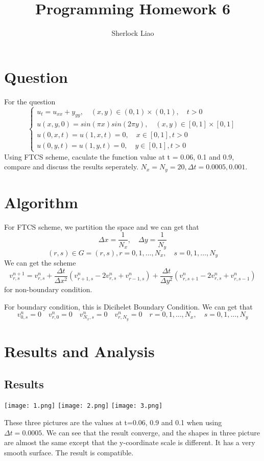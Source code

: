 \documentclass[UTF8]{article}
\author {Sherlock Liao}
\title {Programming Homework 6}
\begin{document}
\maketitle
\section{Question}
For the question
$$
\begin{cases}
u_t = u_{xx} + y_{yy}, \quad (x,y) \in (0,1) \times (0,1), \quad t > 0 \\
u(x,y,0) = sin(\pi x)sin(2\pi y), \quad (x,y) \in [0,1] \times [0,1] \\
u(0,x,t) = u(1,x,t) = 0, \quad x\in [0,1], t > 0 \\
u(0,y,t) = u(1,y,t) = 0, \quad y\in [0,1], t > 0
\end{cases}
$$
Using FTCS scheme, caculate the function value at t = 0.06, 0.1 and 0.9, compare and discuss the results seperately. $N_x = N_y = 20, \Delta t = 0.0005, 0.001.$

\section{Algorithm}
For FTCS scheme, we partition the space and we can get that
$$
\Delta x = \frac{1}{N_x}, \quad \Delta y = \frac{1}{N_y}
$$
$$
(r,s) \in G = {(r,s), r = 0, 1,\dots, N_x, \quad s = 0, 1, \dots, N_y}
$$
We can get the scheme
$$
v_{r,s}^{n+1} = v_{r,s}^n + \frac{\Delta t}{\Delta x^2}(v_{r+1,s}^n -2v_{r,s}^n + v_{r-1,s}^n) + \frac{\Delta t}{\Delta y^2}(v_{r,s+1}^n-2v_{r,s}^n+v_{r,s-1}^n)
$$
for non-boundary condition.

For boundary condition, this is Dicihelet Boundary Condition. We can get that
$$
v_{0,s}^n = 0 \quad v_{r,0}^n = 0 \quad v_{N_x,s}^n = 0 \quad v_{r, N_y}^n = 0 \quad r=0, 1, \dots, N_x, \quad s = 0, 1, \dots, N_y
$$

\section{Results and Analysis}
\subsection{Results}

\texttt{[image: 1.png]}
\texttt{[image: 2.png]}
\texttt{[image: 3.png]}

These three pictures are the values at t=0.06, 0.9 and 0.1 when using $\Delta t = 0.0005$. We can see that the result converge, and the shapes in three picture are almost the same except that the y-coordinate scale is different. It has a very smooth surface. The result is compatible.
\end{document}

